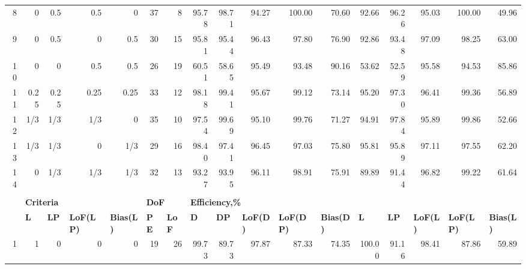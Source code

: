 \begin{landscape}
\begin{table}[p]
{\begin{tabular}{rrrrrrrrrrrrrrrrr}
8 & 0 & 0.5 & 0.5 & 0 & \multicolumn{1}{|r}{37} & 8 & \multicolumn{1}{|r}{95.78} & 98.71 & 94.27 & 100.00 & 70.60 & \multicolumn{1}{|r}{92.66} & 96.26 & 95.03 & 100.00 & 49.96 \\
9 & 0 & 0.5 & 0 & 0.5 & \multicolumn{1}{|r}{30} & 15 & \multicolumn{1}{|r}{95.81} & 95.44 & 96.43 & 97.80 & 76.90 & \multicolumn{1}{|r}{92.86} & 93.48 & 97.09 & 98.25 & 63.00 \\
10 & 0 & 0 & 0.5 & 0.5 & \multicolumn{1}{|r}{26} & 19 & \multicolumn{1}{|r}{60.51} & 58.65 & 95.49 & 93.48 & 90.16 & \multicolumn{1}{|r}{53.62} & 52.59 & 95.58 & 94.53 & 85.86 \\
11 & 0.25 & 0.25 & 0.25 & 0.25 & \multicolumn{1}{|r}{33} & 12 & \multicolumn{1}{|r}{98.18} & 99.41 & 95.67 & 99.12 & 73.14 & \multicolumn{1}{|r}{95.20} & 97.30 & 96.41 & 99.36 & 56.89 \\
12 & 1/3 & 1/3 & 1/3 & 0 & \multicolumn{1}{|r}{35} & 10 & \multicolumn{1}{|r}{97.54} & 99.69 & 95.10 & 99.76 & 71.27 & \multicolumn{1}{|r}{94.91} & 97.84 & 95.89 & 99.86 & 52.66 \\
13 & 1/3 & 1/3 & 0 & 1/3 & \multicolumn{1}{|r}{29} & 16 & \multicolumn{1}{|r}{98.40} & 97.41 & 96.45 & 97.03 & 75.80 & \multicolumn{1}{|r}{95.81} & 95.89 & 97.11 & 97.55 & 62.20 \\
14 & 0 & 1/3 & 1/3 & 1/3 & \multicolumn{1}{|r}{32} & 13 & \multicolumn{1}{|r}{93.27} & 93.95 & 96.11 & 98.91 & 75.91 & \multicolumn{1}{|r}{89.89} & 91.44 & 96.82 & 99.22 & 61.64 \\
 &  &  &  &  &  &  &  &  &  &  &  &  &  &  &  &  \\
\multicolumn{1}{l}{} & \multicolumn{4}{l}{{\bf Criteria}} & \multicolumn{2}{l}{{\bf DoF}} & \multicolumn{10}{l}{{\bf Efficiency,\%}} \\
\multicolumn{1}{l}{} & \multicolumn{1}{l}{{\bf L}} & \multicolumn{1}{l}{{\bf LP}} & \multicolumn{1}{l}{{\bf LoF(LP)}} & \multicolumn{1}{l}{{\bf Bias(L)}} & \multicolumn{1}{l}{{\bf PE}} & \multicolumn{1}{l}{{\bf LoF}} & \multicolumn{1}{l}{{\bf D}} & \multicolumn{1}{l}{{\bf DP}} & \multicolumn{1}{l}{{\bf LoF(D)}} & \multicolumn{1}{l}{{\bf LoF(DP)}} & \multicolumn{1}{l}{{\bf Bias(D)}} & \multicolumn{1}{l}{{\bf L}} & \multicolumn{1}{l}{{\bf LP}} & \multicolumn{1}{l}{{\bf LoF(L)}} & \multicolumn{1}{l}{{\bf LoF(LP)}} & \multicolumn{1}{l}{{\bf Bias(L)}} \\
1 & 1 & 0 & 0 & 0 & \multicolumn{1}{|r}{19} & 26 & \multicolumn{1}{|r}{99.73} & 89.73 & 97.87 & 87.33 & 74.35 & \multicolumn{1}{|r}{100.00} & 91.16 & 98.41 & 87.86 & 59.89 \\

\end{tabular}}
\end{table}
\end{landscape}
